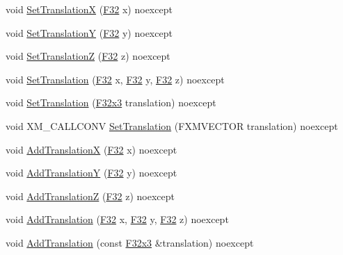 \begin{DoxyCompactItemize}
void \hyperlink{classmage_1_1_local_transform_a6f7d8ee474163d921c8fe485c99a0217}{Set\+TranslationX} (\hyperlink{namespacemage_aa97e833b45f06d60a0a9c4fc22ae02c0}{F32} x) noexcept
\item 
void \hyperlink{classmage_1_1_local_transform_a7e06523876b41b3743e54e11516b61b8}{Set\+TranslationY} (\hyperlink{namespacemage_aa97e833b45f06d60a0a9c4fc22ae02c0}{F32} y) noexcept
\item 
void \hyperlink{classmage_1_1_local_transform_a11733e0dd9297c3742bc3c50056c71c3}{Set\+TranslationZ} (\hyperlink{namespacemage_aa97e833b45f06d60a0a9c4fc22ae02c0}{F32} z) noexcept
\item 
void \hyperlink{classmage_1_1_local_transform_acf9b6ca41b2360d347ae354677d33952}{Set\+Translation} (\hyperlink{namespacemage_aa97e833b45f06d60a0a9c4fc22ae02c0}{F32} x, \hyperlink{namespacemage_aa97e833b45f06d60a0a9c4fc22ae02c0}{F32} y, \hyperlink{namespacemage_aa97e833b45f06d60a0a9c4fc22ae02c0}{F32} z) noexcept
\item 
void \hyperlink{classmage_1_1_local_transform_af172aa7bd7571456717773ffbbdfcac4}{Set\+Translation} (\hyperlink{namespacemage_a73fbe0da4b8d5bc156bb8453e5b63a17}{F32x3} translation) noexcept
\item 
void X\+M\+\_\+\+C\+A\+L\+L\+C\+O\+NV \hyperlink{classmage_1_1_local_transform_a756fd6b64296a0285cbe8447518165c9}{Set\+Translation} (F\+X\+M\+V\+E\+C\+T\+OR translation) noexcept
\item 
void \hyperlink{classmage_1_1_local_transform_aa1e2f6f7db150734e6f10a9d695202d7}{Add\+TranslationX} (\hyperlink{namespacemage_aa97e833b45f06d60a0a9c4fc22ae02c0}{F32} x) noexcept
\item 
void \hyperlink{classmage_1_1_local_transform_a3e058e92d72b6709957712a7d808a6e5}{Add\+TranslationY} (\hyperlink{namespacemage_aa97e833b45f06d60a0a9c4fc22ae02c0}{F32} y) noexcept
\item 
void \hyperlink{classmage_1_1_local_transform_aa2f35831d30101a57d1bfaf1cba527b8}{Add\+TranslationZ} (\hyperlink{namespacemage_aa97e833b45f06d60a0a9c4fc22ae02c0}{F32} z) noexcept
\item 
void \hyperlink{classmage_1_1_local_transform_a2796d9726a59d5a3ea90beee25008222}{Add\+Translation} (\hyperlink{namespacemage_aa97e833b45f06d60a0a9c4fc22ae02c0}{F32} x, \hyperlink{namespacemage_aa97e833b45f06d60a0a9c4fc22ae02c0}{F32} y, \hyperlink{namespacemage_aa97e833b45f06d60a0a9c4fc22ae02c0}{F32} z) noexcept
\item 
void \hyperlink{classmage_1_1_local_transform_ae859ff5d5f4bc7d106b8c4cf233c8f8a}{Add\+Translation} (const \hyperlink{namespacemage_a73fbe0da4b8d5bc156bb8453e5b63a17}{F32x3} \&translation) noexcept

\end{DoxyCompactItemize}
